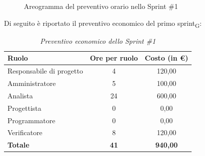 \documentclass[a4paper, 10pt, colorlinks=true, linkcolor=black, urlcolor=blue, citecolor=blue, hidelinks]{article}
\renewcommand{\arraystretch}{1.2}
\begin{document}
\begin{figure}[H]

\caption{Areogramma del preventivo orario nello Sprint \#1}
\label{fig:preventivo-sprint1}
\end{figure}

Di seguito è riportato il preventivo economico del primo sprint\textsubscript{G}:

\begin{table}[H]
    \centering
    \renewcommand{\arraystretch}{1.4}
    \begin{tabular}{|l|c|c|}
        \hline
        \rowcolor{bluBitless!15}
        \textbf{Ruolo} & \textbf{Ore per ruolo} & \textbf{Costo (in €)} \\
        \hline
        Responsabile di progetto & 4 & 120,00 \\ \hline
        Amministratore & 5 & 100,00 \\ \hline
        Analista & 24 & 600,00 \\ \hline
        Progettista & 0 & 0,00 \\ \hline
        Programmatore & 0 & 0,00 \\ \hline
        Verificatore & 8 & 120,00 \\ \hline
        \rowcolor{bluBitless!8}
        \textbf{Totale} & \textbf{41} & \textbf{940,00} \\ \hline
    \end{tabular}
    \caption{\textit{Preventivo economico dello Sprint \#1}}
\end{table}
\end{document}
